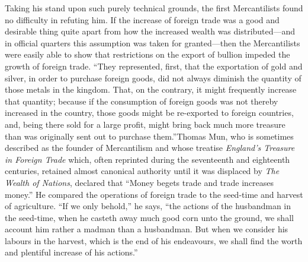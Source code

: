 \documentclass{book}
\begin{document}
Taking his stand upon such purely technical grounds, the first Mercantilists found no difficulty in refuting him. If the increase of foreign trade was a good and desirable thing quite apart from how the increased wealth was distributed—and in official quarters this assumption was taken for granted—then the Mercantilists were easily able to show that restrictions on the export of bullion impeded the growth of foreign trade. “They represented, first, that the exportation of gold and silver, in order to purchase foreign goods, did not always diminish the quantity of those metals in the kingdom. That, on the contrary, it might frequently increase that quantity; because if the consumption of foreign goods was not thereby increased in the country, those goods might be re-exported to foreign countries, and, being there sold for a large profit, might bring back much more treasure than was originally sent out to purchase them.”\footnotemark[2] Thomas Mun, who is sometimes described as the founder of Mercantilism and whose treatise \emph{England’s Treasure in Foreign Trade} which, often reprinted during the seventeenth and eighteenth centuries, retained almost canonical authority until it was displaced by \emph{The Wealth of Nations}, declared that “Money begets trade and trade increases money.” He compared the operations of foreign trade to the seed-time and harvest of agriculture. “If we only behold,” he says, “the actions of the husbandman in the seed-time, when he casteth away much good corn unto the ground, we shall account him rather a madman than a husbandman. But when we consider his labours in the harvest, which is the end of his endeavours, we shall find the worth and plentiful increase of his actions.”
\end{document}
